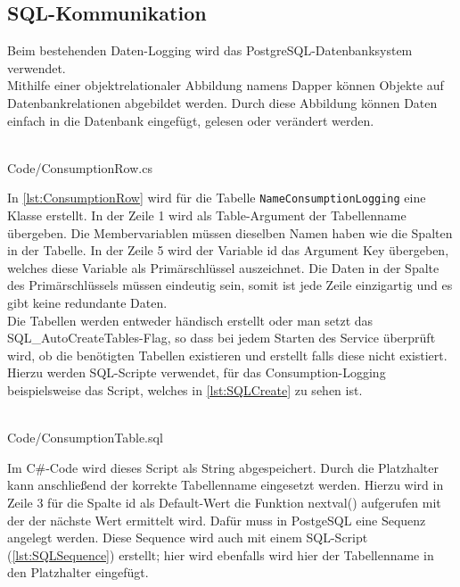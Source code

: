 \subsection{SQL-Kommunikation}
Beim bestehenden Daten-Logging wird das PostgreSQL-Datenbanksystem \cite{postgresql} verwendet. 
\ \\
Mithilfe einer objektrelationaler Abbildung namens Dapper \cite{dapper} können Objekte auf Datenbankrelationen abgebildet werden. Durch diese Abbildung können Daten einfach in die Datenbank eingefügt, gelesen oder verändert werden.
\ \\
\begin{minipage}{\textwidth}
\ \\
 {Code/ConsumptionRow.cs}
\ \\
\end{minipage}
In \autoref{lst:ConsumptionRow} wird für die Tabelle \texttt{NameConsumptionLogging} eine Klasse erstellt. In der Zeile 1 wird als \glqq Table\grqq{}-Argument der Tabellenname übergeben. Die Membervariablen müssen dieselben Namen haben wie die Spalten in der Tabelle. In der Zeile 5 wird der Variable \glqq id\grqq{} das Argument Key übergeben, welches diese Variable als Primärschlüssel auszeichnet. Die Daten in der Spalte des Primärschlüssels müssen eindeutig sein, somit ist jede Zeile einzigartig und es gibt keine redundante Daten. 
\ \\
Die Tabellen werden entweder händisch erstellt oder man setzt das \glqq SQL\_{}AutoCreate\-Tables\grqq{}-Flag, so dass bei jedem Starten des Service überprüft wird, ob die benötigten Tabellen existieren und erstellt falls diese nicht existiert. Hierzu werden SQL-Scripte verwendet, für das Consumption-Logging beispielsweise das Script, welches in \autoref{lst:SQLCreate} zu sehen ist. 
\ \\
\begin{minipage}{\textwidth}
\ \\
 {Code/ConsumptionTable.sql}
\ \\
\end{minipage}
Im C\#{}-Code wird dieses Script als String abgespeichert. Durch die Platzhalter \grqq{} kann anschließend der korrekte Tabellenname eingesetzt werden. Hierzu wird in Zeile 3 für die Spalte \glqq id\grqq{} als Default-Wert die Funktion \glqq nextval()\grqq{} aufgerufen mit der der nächste Wert ermittelt wird. Dafür muss in PostgeSQL eine Sequenz angelegt werden. Diese Sequence wird auch mit einem SQL-Script (\autoref{lst:SQLSequence}) erstellt; hier wird ebenfalls wird hier der Tabellenname in den Platzhalter eingefügt.
